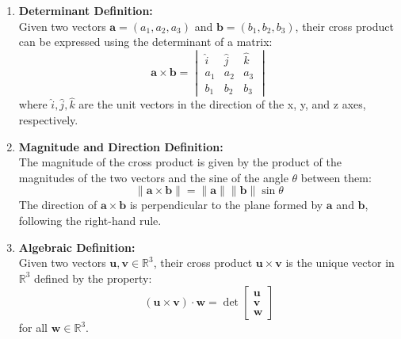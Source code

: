 \documentclass{article}
\begin{document}
\begin{enumerate}
    \item \textbf{Determinant Definition:} \\
    Given two vectors \( \bm{a} = (a_1, a_2, a_3) \) and \( \bm{b} = (b_1, b_2, b_3) \), their cross product can be expressed using the determinant of a matrix:
    \[ \bm{a} \times \bm{b} = \begin{vmatrix}
    \hat{i} & \hat{j} & \hat{k} \\
    a_1 & a_2 & a_3 \\
    b_1 & b_2 & b_3
    \end{vmatrix} \]
    where \( \hat{i}, \hat{j}, \hat{k} \) are the unit vectors in the direction of the x, y, and z axes, respectively.

    \item \textbf{Magnitude and Direction Definition:} \\
    The magnitude of the cross product is given by the product of the magnitudes of the two vectors and the sine of the angle \( \theta \) between them:
    \[ \|\bm{a} \times \bm{b}\| = \|\bm{a}\| \|\bm{b}\| \sin \theta \]
    The direction of \( \bm{a} \times \bm{b} \) is perpendicular to the plane formed by \( \bm{a} \) and \( \bm{b} \), following the right-hand rule.

    \item \textbf{Algebraic Definition:} \\
    Given two vectors \( \bm{u}, \bm{v} \in \mathbb{R}^3 \), their cross product \( \bm{u} \times \bm{v} \) is the unique vector in \( \mathbb{R}^3 \) defined by the property:
    \[ (\bm{u} \times \bm{v}) \cdot \bm{w} = \det \begin{bmatrix} \bm{u} \\ \bm{v} \\ \bm{w} \end{bmatrix} \]
    for all \( \bm{w} \in \mathbb{R}^3 \).
\end{enumerate}

\vspace{0.5cm}
\end{document}
